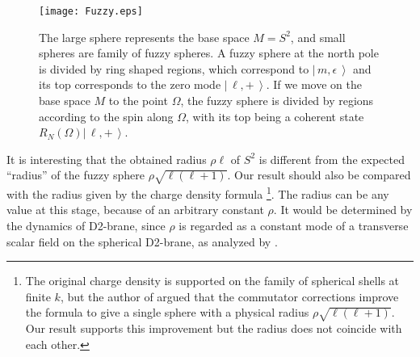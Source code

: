 \documentclass[12pt]{article}
\numberwithin{equation}{section}
\newcommand{\Ket}[1]{\left|\, #1\,\right\rangle}
\begin{document}
\begin{figure}[h]
\begin{center}
	\texttt{[image: Fuzzy.eps]}
\caption{\small 
The large sphere represents the base space $M=S^2$, and small spheres are family of 
fuzzy spheres. 
A fuzzy sphere at the north pole is divided by ring shaped regions, 
which correspond to $\Ket{m,\epsilon}$ and its top 
corresponds to the zero mode $\Ket{\ell,+}$.
If we move on the base space $M$ to the point $\Omega$, the fuzzy sphere  
is divided by regions according to the spin along $\Omega$, with its top being a coherent 
state $R_N(\Omega)\Ket{\ell,+}$.
} 
\label{fig:fuzzy}
\end{center}
\end{figure}

It is interesting that the {obtained} radius $\rho \ell$ of $S^2$ 
is different from the expected ``radius'' of the fuzzy sphere $\rho \sqrt{\ell(\ell +1)}$.
Our result should also be compared with the radius 
given by the charge density formula \cite{Hashimoto2004}%
\footnote{The original charge density is supported on the family of spherical shells at finite $k$, but the author of \cite{Hashimoto2004} argued that the commutator corrections improve the formula to 
give a single sphere with a physical radius $\rho \sqrt{\ell(\ell +1)}$. 
Our result supports this improvement but the radius does not coincide with each other.}.
The radius can be any value at this stage, because of an arbitrary constant $\rho$.
It would be determined by the dynamics of D2-brane, 
since $\rho$ is regarded as a constant mode of a transverse scalar field on the spherical D2-brane,
as analyzed by {\cite{Myers1999}\cite{Asakawa2017}}.
\end{document}
